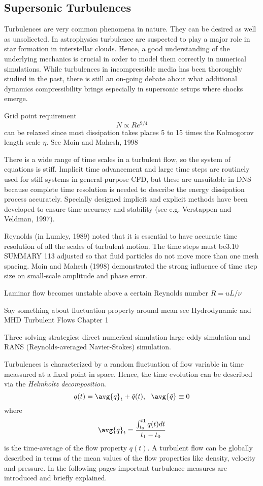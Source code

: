 \subsection{Supersonic Turbulences}

Turbulences are very common phenomena in nature. They can be desired as well as
unsoliceted. In astrophysics turbulence are suspected to play a major role in
star formation in interstellar clouds. Hence, a good understanding of the
underlying mechanics is crucial in order to model them correctly in numerical
simulations. While turbulences in incompressible media has been thoroughly
studied in the past, there is still an on-going debate about what additional
dynamics compressibility brings especially in supersonic setups where shocks
emerge.

Grid point requirement
\begin{equation}
    N \varpropto Re^{9/4}
\end{equation}
can be relaxed since most dissipation takes places 5 to 15 times the
Kolmogorov length scale $\eta$. See Moin and Mahesh, 1998

There is a wide range of time scales in a turbulent flow, so the system of
equations is stiff. Implicit time advancement and large time steps are
routinely used for stiff systems in general-purpose CFD, but these are
unsuitable in DNS because complete time resolution is needed to describe
the energy dissipation process accurately. Specially designed implicit and
explicit methods have been developed to ensure time accuracy and stability
(see e.g. Verstappen and Veldman, 1997).

Reynolds (in Lumley, 1989) noted that it is essential to have accurate time
resolution of all the scales of turbulent motion. The time steps must be3.10 SUMMARY
113
adjusted so that fluid particles do not move more than one mesh spacing.
Moin and Mahesh (1998) demonstrated the strong influence of time step size
on small-scale amplitude and phase error.


Laminar flow becomes unstable above a certain Reynolds number $R = u L/\nu$

Say something about fluctuation property around mean
see Hydrodynamic and MHD Turbulent Flows Chapter 1

Three solving strategies: direct numerical simulation
large eddy simulation and RANS (Reynolds-averaged Navier-Stokes) simulation.

Turbulences is characterized by a random fluctuation of flow variable in time
meassured at a fixed point in space. Hence, the time evolution can be described
via the \emph{Helmholtz decomposition}.
\begin{equation}
    q(t) = \avg{q}_t + \tilde{q}(t), \ \ \avg{\tilde{q}} \equiv 0
\end{equation}
where 
\begin{equation}
    \avg{q}_t = \frac{\int_{t_0}^{t1} q(t) dt}{t_1 - t_0}
\end{equation}
is the time-average of the flow property $q(t)$. A turbulent flow can be
globally described in terms of the mean values of the flow properties like
density, velocity and pressure. In the following pages important turbulence
measures are introduced and briefly explained.

